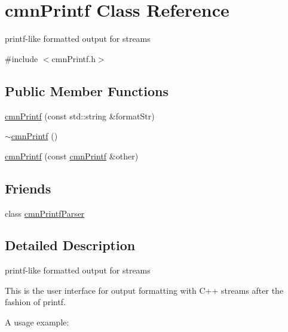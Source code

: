 \hypertarget{classcmn_printf}{}\section{cmn\+Printf Class Reference}
\label{classcmn_printf}


printf-\/like formatted output for streams  




{\ttfamily \#include $<$cmn\+Printf.\+h$>$}

\subsection*{Public Member Functions}
\begin{DoxyCompactItemize}
\item 
\hyperlink{classcmn_printf_af834e91520896f203bf74171a852e38f}{cmn\+Printf} (const std\+::string \&format\+Str)
\item 
\hyperlink{classcmn_printf_a90b02799c58a696eeef7e3ecc2772834}{$\sim$cmn\+Printf} ()
\item 
\hyperlink{classcmn_printf_a22f12554c865b206fb5cac761a3cd0db}{cmn\+Printf} (const \hyperlink{classcmn_printf}{cmn\+Printf} \&other)
\end{DoxyCompactItemize}
\subsection*{Friends}
\begin{DoxyCompactItemize}
\item 
class \hyperlink{classcmn_printf_a73ad898e5a1725bb1c99d1bccadf68b2}{cmn\+Printf\+Parser}
\end{DoxyCompactItemize}


\subsection{Detailed Description}
printf-\/like formatted output for streams 

This is the user interface for output formatting with C++ streams after the fashion of printf.

A usage example\+:




